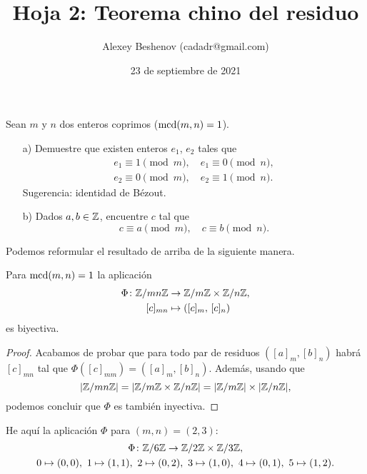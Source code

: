\documentclass{article}
\title{Hoja 2: Teorema chino del residuo}
\author{Alexey Beshenov (cadadr@gmail.com)}
\date{23 de septiembre de 2021}
\begin{document}
\maketitle
\thispagestyle{empty}

\setcounter{section}{2}

\begin{problema}
  Sean $m$ y $n$ dos enteros coprimos ($\operatorname{mcd} (m,n) = 1$).

  \begin{itemize}
  \item[a)] Demuestre que existen enteros $e_1$, $e_2$ tales que
    \begin{gather*}
      e_1 \equiv 1 \pmod{m}, \quad e_1 \equiv 0 \pmod{n}, \\
      e_2 \equiv 0 \pmod{m}, \quad e_2 \equiv 1 \pmod{n}.
    \end{gather*}
    Sugerencia: identidad de Bézout.

  \item[b)] Dados $a, b \in \mathbb{Z}$, encuentre $c$ tal que
    $$c \equiv a \pmod{m}, \quad c \equiv b \pmod{n}.$$
  \end{itemize}
\end{problema}

Podemos reformular el resultado de arriba de la siguiente manera.

\begin{framed}
  Para $\operatorname{mcd} (m,n) = 1$ la aplicación
  \begin{align*}
    \Phi\colon \mathbb{Z}/mn\mathbb{Z} & \to \mathbb{Z}/m\mathbb{Z} \times \mathbb{Z}/n\mathbb{Z},\\
    [c]_{mn} & \mapsto ([c]_m, \, [c]_n)
  \end{align*}
  es biyectiva.
\end{framed}

\begin{proof}
  Acabamos de probar que para todo par de residuos $([a]_m, [b]_n)$ habrá
  $[c]_{mn}$ tal que $\Phi ([c]_{mm}) = ([a]_m,[b]_n)$.  Además, usando que
  $$|\mathbb{Z}/mn\mathbb{Z}| = |\mathbb{Z}/m\mathbb{Z} \times \mathbb{Z}/n\mathbb{Z}| = |\mathbb{Z}/m\mathbb{Z}| \times |\mathbb{Z}/n\mathbb{Z}|,$$
  podemos concluir que $\Phi$ es también inyectiva.
\end{proof}

\begin{ejemplo}
  He aquí la aplicación $\Phi$ para $(m,n) = (2,3)$:
  \begin{gather*}
    \Phi\colon \mathbb{Z}/6\mathbb{Z} \to \mathbb{Z}/2\mathbb{Z} \times \mathbb{Z}/3\mathbb{Z},\\
    0 \mapsto (0,0), ~
    1 \mapsto (1,1), ~
    2 \mapsto (0,2), ~
    3 \mapsto (1,0), ~
    4 \mapsto (0,1), ~
    5 \mapsto (1,2).
  \end{gather*}
\end{ejemplo}
\end{document}

